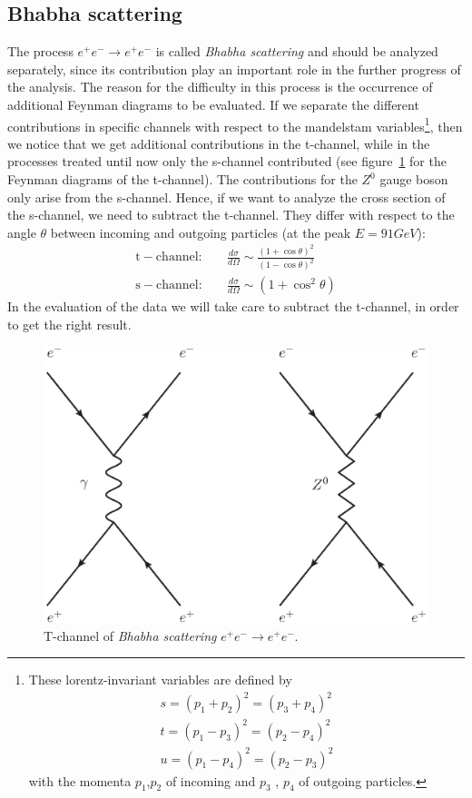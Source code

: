 \subsection{Bhabha scattering}
\label{sub:bhabha}
The process $e^+e^-\rightarrow e^+ e^-$ is called \textit{Bhabha scattering} and should be analyzed separately, since its
contribution play an important role in the further progress of the analysis. The reason for the difficulty in this process
is the occurrence of additional Feynman diagrams to be evaluated. If we separate the different contributions in specific  
channels with respect to the mandelstam variables\footnote{These lorentz-invariant variables are defined by 
\begin{align*}
s=(p_1+p_2)^2=(p_3+p_4)^2 \\
t=(p_1-p_3)^2=(p_2-p_4)^2 \\
u=(p_1-p_4)^2=(p_2-p_3)^2
\end{align*}
with the momenta $p_1$,$p_2$ of incoming and $p_3$ , $p_4$ of outgoing particles.
}, 
then we notice that we get additional contributions in the
t-channel, while in the processes treated until now only the s-channel contributed (see figure~\ref{fig:bhabha} for the
Feynman diagrams of the t-channel). The contributions for the $Z^0$ gauge boson only arise from the s-channel. Hence, if we
want to analyze the cross section of the s-channel, we need to subtract the t-channel. They differ with respect to the
angle $\theta$ between incoming and outgoing particles (at the peak $E=91GeV$):
\begin{align} 
  \mathrm{t-channel:}\quad    &\frac{d\sigma}{d\Omega} \sim \frac{(1+\cos\theta)^2}{(1-\cos \theta)^2}\\
  \mathrm{s-channel:}\quad    &\frac{d\sigma}{d\Omega} \sim (1+\cos^2\theta)
\end{align}
In the evaluation of the data we will take care to subtract the t-channel, in order to get the right result.

\begin{figure}[htpb]
    \centering
    \includegraphics[width=0.6\linewidth]{figures/bhabha}
    \caption{T-channel of \textit{Bhabha scattering} $e^+e^-\rightarrow e^+ e^-$.}
    \label{fig:bhabha}
\end{figure}

